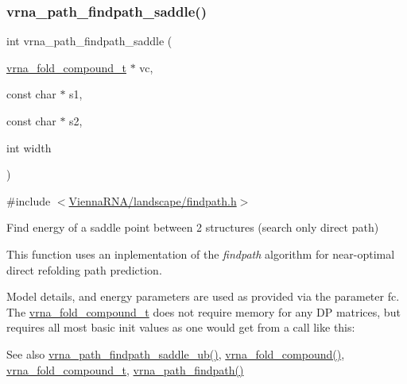 \subsubsection{\texorpdfstring{vrna\_path\_findpath\_saddle()}{vrna\_path\_findpath\_saddle()}}
{\footnotesize\ttfamily int vrna\+\_\+path\+\_\+findpath\+\_\+saddle (\begin{DoxyParamCaption}\item[{\mbox{\hyperlink{group__fold__compound_ga1b0cef17fd40466cef5968eaeeff6166}{vrna\+\_\+fold\+\_\+compound\+\_\+t}} $\ast$}]{vc,  }\item[{const char $\ast$}]{s1,  }\item[{const char $\ast$}]{s2,  }\item[{int}]{width }\end{DoxyParamCaption})}



{\ttfamily \#include $<$\mbox{\hyperlink{landscape_2findpath_8h}{Vienna\+R\+N\+A/landscape/findpath.\+h}}$>$}



Find energy of a saddle point between 2 structures (search only direct path) 

This function uses an inplementation of the {\itshape findpath} algorithm \cite{flamm:2001} for near-\/optimal direct refolding path prediction.

Model details, and energy parameters are used as provided via the parameter \textquotesingle{}fc\textquotesingle{}. The \mbox{\hyperlink{group__fold__compound_ga1b0cef17fd40466cef5968eaeeff6166}{vrna\+\_\+fold\+\_\+compound\+\_\+t}} does not require memory for any DP matrices, but requires all most basic init values as one would get from a call like this\+: 
\begin{DoxyCode}{0}
\end{DoxyCode}


\begin{DoxySeeAlso}{See also}
\mbox{\hyperlink{group__paths__direct_gaca6d3ab6f8b9463e3382bd1f474c26f1}{vrna\+\_\+path\+\_\+findpath\+\_\+saddle\+\_\+ub()}}, \mbox{\hyperlink{group__fold__compound_ga6601d994ba32b11511b36f68b08403be}{vrna\+\_\+fold\+\_\+compound()}}, \mbox{\hyperlink{group__fold__compound_ga1b0cef17fd40466cef5968eaeeff6166}{vrna\+\_\+fold\+\_\+compound\+\_\+t}}, \mbox{\hyperlink{group__paths__direct_ga2fed8ff126f5becd82cedd81a25c9bf0}{vrna\+\_\+path\+\_\+findpath()}}
\end{DoxySeeAlso}

